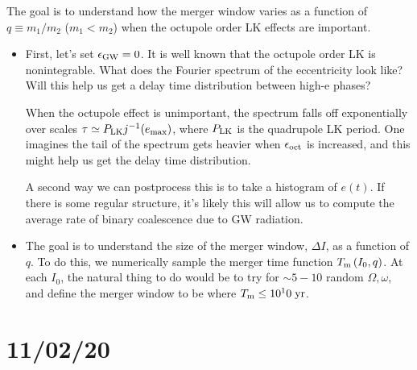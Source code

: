 \documentclass[11pt,
        usenames, %
        dvipsnames %
    ]{article}
\newcommand*{\p}[1]{\left(#1\right)}
\begin{document}
The goal is to understand how the merger window varies as a function of $q
\equiv m_1 / m_2$ ($m_1 < m_2$) when the octupole order LK effects are
important.
\begin{itemize}
    \item First, let's set $\epsilon_{\rm GW} = 0$. It is well known that the
        octupole order LK is nonintegrable. What does the Fourier spectrum of
        the eccentricity look like? Will this help us get a delay time
        distribution between high-e phases?

        When the octupole effect is unimportant, the spectrum falls off
        exponentially over scales $\tau \simeq P_{\rm LK} j^{-1}(e_{\max})$,
        where $P_{\rm LK}$ is the quadrupole LK period. One imagines the
        tail of the spectrum gets heavier when $\epsilon_{\rm oct}$ is
        increased, and this might help us get the delay time distribution.

        A second way we can postprocess this is to take a histogram of $e(t)$.
        If there is some regular structure, it's likely this will allow us to
        compute the average rate of binary coalescence due to GW radiation.

    \item The goal is to understand the size of the merger window, $\Delta I$,
        as a function of $q$. To do this, we numerically sample the merger time
        function $T_{\rm m}\p{I_0, q}$. At each $I_0$, the natural thing to do
        would be to try for $\sim 5-10$ random $\Omega, \omega$, and define the
        merger window to be where $T_{\rm m} \leq 10^10\;\mathrm{yr}$.
\end{itemize}

\section{11/02/20}
\end{document}
